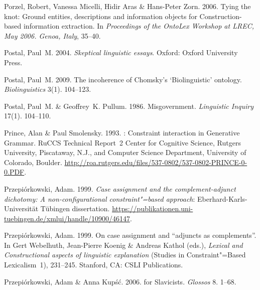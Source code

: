 \begin{thebibliography}{1420}
Porzel, Robert, Vanessa Micelli, Hidir Aras \& Hans-Peter Zorn. 2006.
\newblock Tying the knot: {Ground} entities, descriptions and information
  objects for {Construction}-based information extraction.
\newblock In \emph{Proceedings of the {OntoLex Workshop at LREC, May 2006.
  Genoa, Italy}}, 35--40.

Postal, Paul~M. 2004.
\newblock \emph{Skeptical linguistic essays}.
\newblock Oxford: Oxford University Press.

Postal, Paul~M. 2009.
\newblock The incoherence of {Chomsky's} `{Biolinguistic}' ontology.
\newblock \emph{Biolinguistics} 3(1). 104--123.

Postal, Paul~M. \& Geoffrey~K. Pullum. 1986.
\newblock Misgovernment.
\newblock \emph{Linguistic Inquiry} 17(1). 104--110.

Prince, Alan \& Paul Smolensky. 1993.
: {Constraint} interaction in {Generative
  Grammar}.
\newblock RuCCS Technical Report~2 Center for Cognitive Science, Rutgers
  University, Piscataway, N.J., and Computer Science Department, University of
  Colorado, Boulder.
\newblock
  \urlprefix\url{http://roa.rutgers.edu/files/537-0802/537-0802-PRINCE-0-0.PDF}.

Przepi{\'o}rkowski, Adam. 1999{}.
\newblock \emph{Case assignment and the complement-adjunct dichotomy: {A}
  non-con\-fig\-u\-ra\-tion\-al constraint"=based approach}:
  Eberhard-Karls-Universit{\"a}t T{\"u}bingen dissertation.
\newblock
  \urlprefix\url{https://publikationen.uni-tuebingen.de/xmlui/handle/10900/46147}.

Przepi{\'o}rkowski, Adam. 1999{}.
\newblock On case assignment and ``adjuncts as complements''.
\newblock In Gert Webelhuth, Jean-Pierre Koenig \& Andreas Kathol (eds.),
  \emph{Lexical and {Constructional} aspects of linguistic explanation}
  (Studies in Constraint"=Based Lexicalism~1), 231--245. Stanford, CA: CSLI
  Publications.

Przepi{\'o}rkowski, Adam \& Anna Kup{\'s}{\'c}. 2006.
 for {Slavicists}.
\newblock \emph{Glossos} 8. 1--68.


\end{thebibliography}
